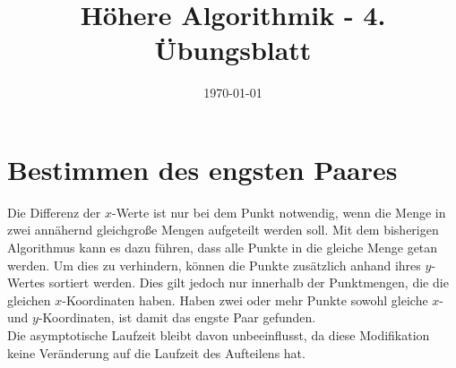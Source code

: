 \documentclass[a4paper,10pt]{article}
\title{H\"ohere Algorithmik - 4. \"Ubungsblatt}
\author{\Authors}
\date{\today}
\begin{document}
\maketitle

\section{Bestimmen des engsten Paares}
Die Differenz der $x$-Werte ist nur bei dem Punkt notwendig, wenn die Menge in zwei annähernd gleichgroße Mengen aufgeteilt werden soll. Mit dem bisherigen Algorithmus kann es dazu führen, dass alle Punkte in die gleiche Menge getan werden. Um dies zu verhindern, können die Punkte zusätzlich anhand ihres $y$-Wertes sortiert werden. Dies gilt jedoch nur innerhalb der Punktmengen, die die gleichen $x$-Koordinaten haben. Haben zwei oder mehr Punkte sowohl gleiche $x$- und $y$-Koordinaten, ist damit das engste Paar gefunden.\\
Die asymptotische Laufzeit bleibt davon unbeeinflusst, da diese Modifikation keine Veränderung auf die Laufzeit des Aufteilens hat.
\end{document}
